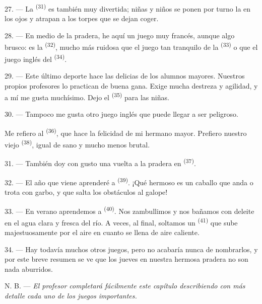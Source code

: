 \VUsaut{5.0mm}
\VUsaut{3.4mm}

27. --- La  \textsuperscript{(31)} es también muy divertida;
niñas y niños se ponen por turno la  en los ojos y atrapan a
los torpes que se dejan coger.

28. --- En medio de la pradera, he aquí un juego muy francés, aunque algo
brusco: es la  \textsuperscript{(32)}, mucho más ruidosa que el juego
tan tranquilo de la  \textsuperscript{(33)} o que el juego inglés del
 \textsuperscript{(34)}.

29. --- Este último deporte hace las delicias de los alumnos mayores.
Nuestros propios profesores lo practican de buena gana. Exige mucha
destreza y agilidad, y a mí me gusta muchísimo. Dejo el 
\textsuperscript{(35)} para las niñas.

30. --- Tampoco me gusta otro juego inglés que puede llegar a ser
peligroso.

Me refiero al  \textsuperscript{(36)}, que hace la felicidad de mi
hermano mayor. Prefiero nuestro viejo 
\textsuperscript{(38)}, igual de sano y mucho menos brutal.

\VUsaut{4.6mm}
\VUsaut{3.0mm}

31. --- También doy con gusto una vuelta a la pradera en 
\textsuperscript{(37)}.

32. --- El año que viene aprenderé a 
\textsuperscript{(39)}. ¡Qué hermoso es un caballo que anda o trota con garbo, y
que salta los obstáculos al galope!

33. --- En verano aprendemos a  \textsuperscript{(40)}. Nos zambullimos
y nos bañamos con deleite en el agua clara y fresca del río. A veces, al
final, soltamos un  \textsuperscript{(41)} que sube
majestuosamente por el aire en cuanto se llena de aire caliente.

34. --- Hay todavía muchos otros juegos, pero no acabaría nunca de
nombrarlos, y por este breve resumen se ve que los jueves en nuestra
hermosa pradera no son nada aburridos.

N. B. --- \textit{El profesor completará fácilmente este capítulo
describiendo con más detalle cada uno de los juegos importantes.}
\VUsaut{6.0mm}
\VUfilet{22mm}
